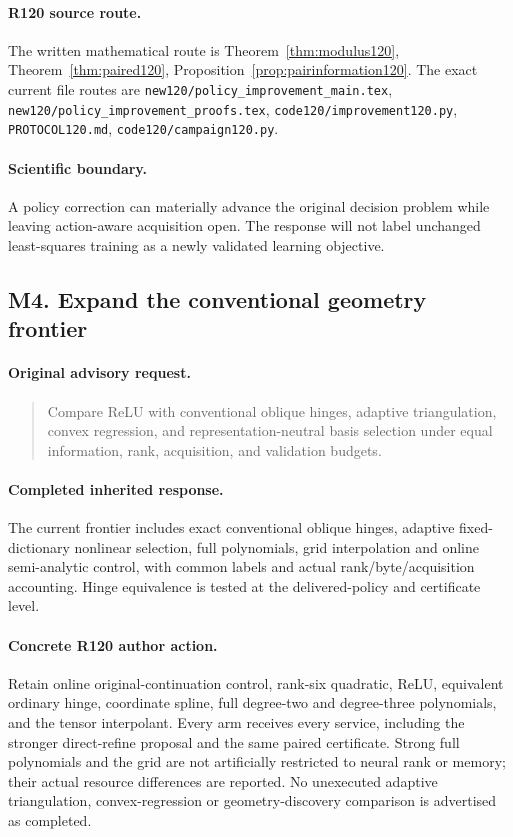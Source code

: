 \paragraph{R120 source route.}
The written mathematical route is Theorem~\ref{thm:modulus120}, Theorem~\ref{thm:paired120}, Proposition~\ref{prop:pairinformation120}. The exact current file routes are \nolinkurl{new120/policy_improvement_main.tex}, \nolinkurl{new120/policy_improvement_proofs.tex}, \nolinkurl{code120/improvement120.py}, \nolinkurl{PROTOCOL120.md}, \nolinkurl{code120/campaign120.py}.
\paragraph{Scientific boundary.}
A policy correction can materially advance the original decision problem while leaving action-aware acquisition open. The response will not label unchanged least-squares training as a newly validated learning objective.

\subsection{M4. Expand the conventional geometry frontier}
\label{response120:M4}
\paragraph{Original advisory request.}
\begin{quote}
Compare ReLU with conventional oblique hinges, adaptive triangulation, convex regression, and representation-neutral basis selection under equal information, rank, acquisition, and validation budgets.
\end{quote}
\paragraph{Completed inherited response.}
The current frontier includes exact conventional oblique hinges, adaptive fixed-dictionary nonlinear selection, full polynomials, grid interpolation and online semi-analytic control, with common labels and actual rank/byte/acquisition accounting. Hinge equivalence is tested at the delivered-policy and certificate level.
\paragraph{Concrete R120 author action.}
Retain online original-continuation control, rank-six quadratic, ReLU, equivalent ordinary hinge, coordinate spline, full degree-two and degree-three polynomials, and the tensor interpolant. Every arm receives every service, including the stronger direct-refine proposal and the same paired certificate. Strong full polynomials and the grid are not artificially restricted to neural rank or memory; their actual resource differences are reported. No unexecuted adaptive triangulation, convex-regression or geometry-discovery comparison is advertised as completed.
